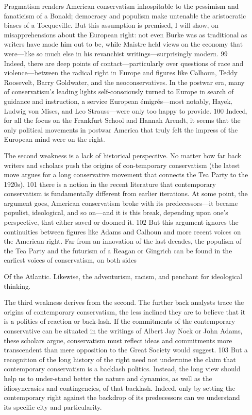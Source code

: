 \par 
Pragmatism renders American conservatism inhospitable to the pessimism and fanaticism of a Bonald; democracy and populism make untenable the aristocratic biases of a Tocqueville. But this assumption is premised, I will show, on misapprehensions about the European right: not even Burke was as traditional as writers have made him out to be, while Maistre held views on the economy that were—like so much else in his revanchist writings—surprisingly modern. {\color{blue}99} Indeed, there are deep points of contact—particularly over questions of race and violence—between the radical right in Europe and figures like Calhoun, Teddy Roosevelt, Barry Goldwater, and the neoconservatives. In the postwar era, many of conservatism’s leading lights self-consciously turned to Europe in search of guidance and instruction, a service European émigrés—most notably, Hayek, Ludwig von Mises, and Leo Strauss—were only too happy to provide. {\color{blue}100} Indeed, for all the focus on the Frankfurt School and Hannah Arendt, it seems that the only political movements in postwar America that truly felt the impress of the European mind were on the right.
 \par 
The second weakness is a lack of historical perspective. No matter how far back writers and scholars push the origins of con-temporary conservatism (the latest move argues for a long conservative movement that connects the Tea Party to the 1920s), {\color{blue}101} there is a notion in the recent literature that contemporary conservatism is fundamentally different from earlier iterations. At some point, the argument goes, American conservatism broke with its predecessors—it became populist, ideological, and so on—and it is this break, depending upon one’s perspective, that either saved or doomed it. {\color{blue}102} But this argument ignores the continuities between figures like Adams and Calhoun and more recent voices on the American right. Far from an innovation of the last decades, the populism of the Tea Party and the futurism of a Reagan or Gingrich can be found in the earliest voices of conservatism, on both sides
 \par 
Of the Atlantic. Likewise, the adventurism, racism, and penchant for ideological thinking.
 \par 
The third weakness derives from the second. The further back analysts trace the origins of contemporary conservatism, the less inclined they are to believe that it is a politics of reaction or back-lash. If the commitments of the contemporary conservative can be situated in the writings of Albert Jay Nock or John Adams, these scholars argue, conservatism must reflect ideas and commitments more transcendent than mere opposition to the Great Society would suggest. {\color{blue}103} But a recognition of the long history of the right need not undermine the claim that contemporary conservatism is a backlash politics. Instead, the long view should help us to under-stand better the nature and dynamics, as well as the idiosyncrasies and contingencies, of that backlash. Indeed, only by setting the contemporary right against the backdrop of its predecessors can we understand its specific city and particularity.
